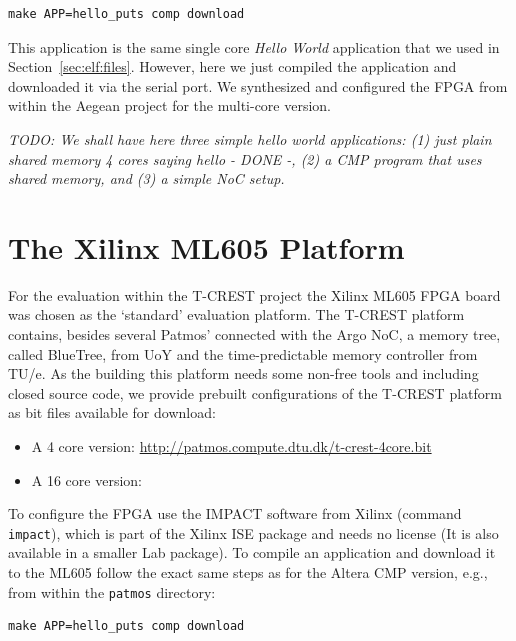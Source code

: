 \documentclass[a4paper,fontsize=10pt,twoside,DIV15,BCOR12mm,headinclude=true,footinclude=false,pagesize,bibtotoc]{scrbook}
\newcommand{\code}[1]{{\texttt{#1}}}
\newcommand{\todo}[1]{{\emph{TODO: #1}}}
\begin{document}
\begin{verbatim}
make APP=hello_puts comp download
\end{verbatim}

This application is the same single core \emph{Hello World} application that
we used in Section~\ref{sec:elf:files}. However, here we just compiled the
application and downloaded it via the serial port. We synthesized and configured
the FPGA from within the Aegean project for the multi-core version.

\todo{We shall have here three simple hello world applications: (1) just plain shared memory 4 cores saying hello - DONE -,
(2) a CMP program that uses shared memory, and (3) a simple NoC setup.}



\section{The Xilinx ML605 Platform}

For the evaluation within the T-CREST project the Xilinx ML605 FPGA board was chosen as the `standard'
evaluation platform. The T-CREST platform contains, besides several Patmos' connected with the Argo NoC,
a memory tree, called BlueTree, from UoY and the time-predictable memory controller from TU/e. As the
building this platform needs some non-free tools and including closed source code, we provide prebuilt
configurations of the T-CREST platform as bit files available for download:

\begin{itemize}
\item A 4 core version: \url{http://patmos.compute.dtu.dk/t-crest-4core.bit}
\item A 16 core version: 
\end{itemize}

To configure the FPGA use the IMPACT software from Xilinx (command \code{impact}), which is part of the Xilinx ISE package
and needs no license (It is also available in a smaller Lab package). To compile an application and
download it to the ML605 follow the exact same steps as for the Altera CMP version, e.g., from
within the \code{patmos} directory:

\begin{verbatim}
make APP=hello_puts comp download
\end{verbatim}
\end{document}
